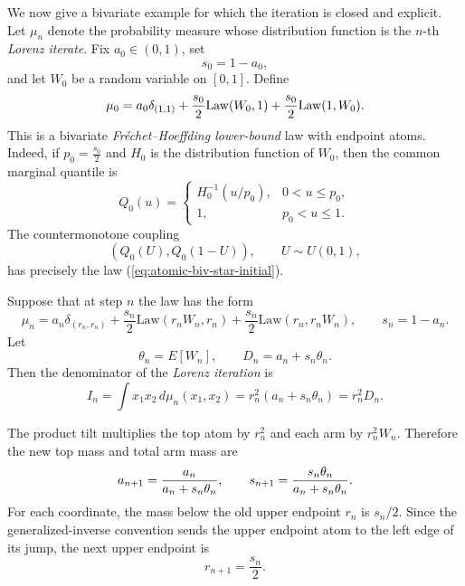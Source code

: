 \documentclass[onecolumn]{article}
\begin{document}
We now give a bivariate example for which the iteration is closed and
explicit. Let $\mu _{n}$ denote the probability measure whose distribution
function is the $n$-th \textit{Lorenz iterate}. Fix $a_{0}\in (0,1)$, set 
\begin{equation*}
s_{0}=1-a_{0},
\end{equation*}%
and let $W_{0}$ be a random variable on $[0,1]$. Define 
\begin{equation}
\mu _{0}=a_{0}\delta _{(1,1)}+\frac{s_{0}}{2}\mathrm{Law}(W_{0},1)+\frac{%
s_{0}}{2}\mathrm{Law}(1,W_{0}).  \label{eq:atomic-biv-star-initial}
\end{equation}%
This is a bivariate \textit{Fr\'{e}chet--Hoeffding lower-bound} law with
endpoint atoms. Indeed, if $p_{0}=\frac{s_{0}}{2}$ and $H_{0}$ is the
distribution function of $W_{0}$, then the common marginal quantile is 
\begin{equation*}
Q_{0}(u)=%
\begin{cases}
H_{0}^{-1}(u/p_{0}), & 0<u\leq p_{0}, \\ 
1, & p_{0}<u\leq 1.%
\end{cases}%
\end{equation*}%
The countermonotone coupling 
\begin{equation*}
(Q_{0}(U),Q_{0}(1-U)),\qquad U\sim U(0,1),
\end{equation*}%
has precisely the law (\ref{eq:atomic-biv-star-initial}).

Suppose that at step $n$ the law has the form 
\begin{equation}
\mu _{n}=a_{n}\delta _{(r_{n},r_{n})}+\frac{s_{n}}{2}\mathrm{Law}%
(r_{n}W_{n},r_{n})+\frac{s_{n}}{2}\mathrm{Law}(r_{n},r_{n}W_{n}),\qquad
s_{n}=1-a_{n}.  \label{eq:atomic-biv-star-n}
\end{equation}%
Let 
\begin{equation*}
\theta _{n}=E[W_{n}],\qquad D_{n}=a_{n}+s_{n}\theta _{n}.
\end{equation*}%
Then the denominator of the \textit{Lorenz iteration} is 
\begin{equation}
I_{n}=\int x_{1}x_{2}\,d\mu _{n}(x_{1},x_{2})=r_{n}^{2}(a_{n}+s_{n}\theta
_{n})=r_{n}^{2}D_{n}.  \label{eq:atomic-biv-In}
\end{equation}

The product tilt multiplies the top atom by $r_n^2$ and each arm by $%
r_n^2W_n $. Therefore the new top mass and total arm mass are 
\begin{equation}
a_{n+1} = \frac{a_n}{a_n+s_n\theta_n}, \qquad s_{n+1} = \frac{s_n\theta_n}{%
a_n+s_n\theta_n}.  \label{eq:atomic-biv-mass-recursion}
\end{equation}
For each coordinate, the mass below the old upper endpoint $r_n$ is $s_n/2$.
Since the generalized-inverse convention sends the upper endpoint atom to
the left edge of its jump, the next upper endpoint is 
\begin{equation}
r_{n+1}=\frac{s_n}{2}.  \label{eq:atomic-biv-r-recursion}
\end{equation}
\end{document}
